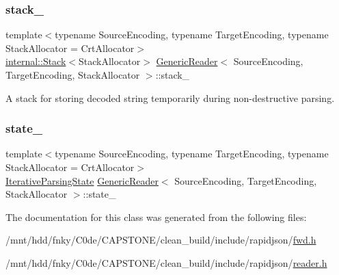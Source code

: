 \subsubsection{\texorpdfstring{stack\+\_\+}{stack\_}}
{\footnotesize\ttfamily template$<$typename Source\+Encoding, typename Target\+Encoding, typename Stack\+Allocator = Crt\+Allocator$>$ \\
\hyperlink{classinternal_1_1Stack}{internal\+::\+Stack}$<$Stack\+Allocator$>$ \hyperlink{classGenericReader}{Generic\+Reader}$<$ Source\+Encoding, Target\+Encoding, Stack\+Allocator $>$\+::stack\+\_\+\hspace{0.3cm}{\ttfamily [private]}}



A stack for storing decoded string temporarily during non-\/destructive parsing. 

\mbox{\label{classGenericReader_ae155ea97ca78d4ee6c8d848b5b1da3dc}} 
\subsubsection{\texorpdfstring{state\+\_\+}{state\_}}
{\footnotesize\ttfamily template$<$typename Source\+Encoding, typename Target\+Encoding, typename Stack\+Allocator = Crt\+Allocator$>$ \\
\hyperlink{classGenericReader_a269700a68b925db2f3ecc84b75f2277e}{Iterative\+Parsing\+State} \hyperlink{classGenericReader}{Generic\+Reader}$<$ Source\+Encoding, Target\+Encoding, Stack\+Allocator $>$\+::state\+\_\+\hspace{0.3cm}{\ttfamily [private]}}



The documentation for this class was generated from the following files\+:\begin{DoxyCompactItemize}
\item 
/mnt/hdd/fnky/\+C0de/\+C\+A\+P\+S\+T\+O\+N\+E/clean\+\_\+build/include/rapidjson/\hyperlink{fwd_8h}{fwd.\+h}\item 
/mnt/hdd/fnky/\+C0de/\+C\+A\+P\+S\+T\+O\+N\+E/clean\+\_\+build/include/rapidjson/\hyperlink{reader_8h}{reader.\+h}\end{DoxyCompactItemize}
